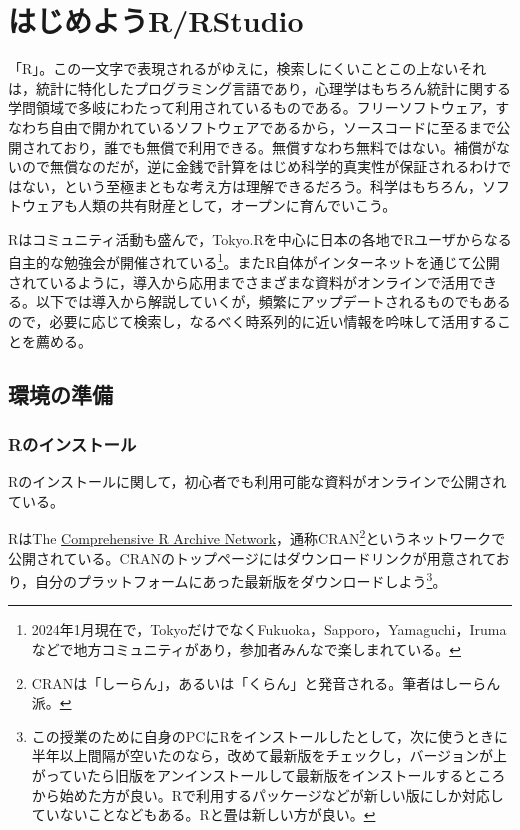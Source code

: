 \documentclass[
  a4paper,
]{ltjsbook}
\begin{document}
\chapter{はじめようR/RStudio}\label{ux306fux3058ux3081ux3088ux3046rrstudio}

「R」。この一文字で表現されるがゆえに，検索しにくいことこの上ないそれは，統計に特化したプログラミング言語であり，心理学はもちろん統計に関する学問領域で多岐にわたって利用されているものである。フリーソフトウェア，すなわち自由で開かれているソフトウェアであるから，ソースコードに至るまで公開されており，誰でも無償で利用できる。無償すなわち無料ではない。補償がないので無償なのだが，逆に金銭で計算をはじめ科学的真実性が保証されるわけではない，という至極まともな考え方は理解できるだろう。科学はもちろん，ソフトウェアも人類の共有財産として，オープンに育んでいこう。

Rはコミュニティ活動も盛んで，Tokyo.Rを中心に日本の各地でRユーザからなる自主的な勉強会が開催されている\footnote{2024年1月現在で，TokyoだけでなくFukuoka，Sapporo，Yamaguchi，Irumaなどで地方コミュニティがあり，参加者みんなで楽しまれている。}。またR自体がインターネットを通じて公開されているように，導入から応用までさまざまな資料がオンラインで活用できる。以下では導入から解説していくが，頻繁にアップデートされるものでもあるので，必要に応じて検索し，なるべく時系列的に近い情報を吟味して活用することを薦める。

\section{環境の準備}\label{ux74b0ux5883ux306eux6e96ux5099}

\subsection{Rのインストール}\label{rux306eux30a4ux30f3ux30b9ux30c8ux30fcux30eb}

Rのインストールに関して，初心者でも利用可能な資料がオンラインで公開されている。

RはThe \href{https://cran.r-project.org/}{Comprehensive R Archive
Network}，通称CRAN\footnote{CRANは「しーらん」，あるいは「くらん」と発音される。筆者はしーらん派。}というネットワークで公開されている。CRANのトップページにはダウンロードリンクが用意されており，自分のプラットフォームにあった最新版をダウンロードしよう\footnote{この授業のために自身のPCにRをインストールしたとして，次に使うときに半年以上間隔が空いたのなら，改めて最新版をチェックし，バージョンが上がっていたら旧版をアンインストールして最新版をインストールするところから始めた方が良い。Rで利用するパッケージなどが新しい版にしか対応していないことなどもある。Rと畳は新しい方が良い。}。
\end{document}
